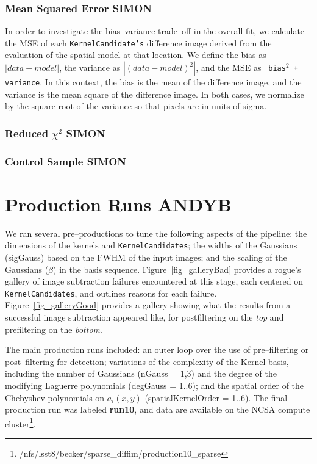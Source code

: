 \documentclass[prd, nofootinbib, floatfix, 11pt,tightenlines,times]{article}
\begin{document}
\subsubsection{Mean Squared Error {\bf SIMON}}

In order to investigate the bias--variance trade--off in the overall
fit, we calculate the MSE of each {\tt KernelCandidate's} difference
image derived from the evaluation of the spatial model at that
location.  We define the bias as $\left| data - model \right|$, the
variance as $\left| (data - model)^2 \right|$, and the MSE as {\tt
  bias$^2$ + variance}.  In this context, the bias is the mean of the
difference image, and the variance is the mean square of the
difference image.  In both cases, we normalize by the square root of
the variance so that pixels are in units of sigma.

\subsubsection{Reduced $\chi^2$ {\bf SIMON}}

\subsubsection{Control Sample {\bf SIMON}}

\section{Production Runs {\bf ANDYB}}

We ran several pre--productions to tune the following aspects of the
pipeline: the dimensions of the kernels and {\tt KernelCandidates};
the widths of the Gaussians (sigGauss) based on the FWHM of the input
images; and the scaling of the Gaussians ($\beta$) in the basis
sequence.  Figure~\ref{fig_galleryBad} provides a rogue's gallery of
image subtraction failures encountered at this stage, each centered on
{\tt KernelCandidates}, and outlines reasons for each failure.
Figure~\ref{fig_galleryGood} provides a gallery showing what the
results from a successful image subtraction appeared like, for
postfiltering on the {\it top} and prefiltering on the {\it bottom}.

The main production runs included: an outer loop over the use of
pre--filtering or post--filtering for detection; variations of the
complexity of the Kernel basis, including the number of Gaussians
(nGauss = 1,3) and the degree of the modifying Laguerre polynomials
(degGauss = 1..6); and the spatial order of the Chebyshev polynomials
on $a_i(x,y)$ (spatialKernelOrder = 1..6).  The final production run
was labeled {\bf run10}, and data are available on the NCSA compute
cluster\footnote{/nfs/lsst8/becker/sparse\_diffim/production10\_sparse}.
\end{document}
